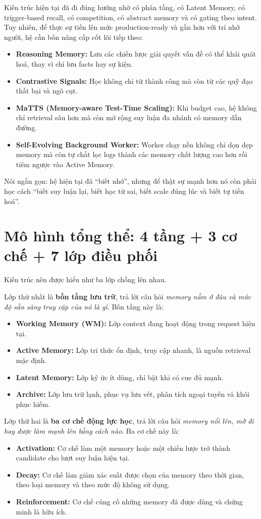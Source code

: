 \documentclass[a4paper,12pt]{article}
\begin{document}
Kiến trúc hiện tại đã đi đúng hướng nhờ có phân tầng, có Latent Memory, có trigger-based recall, có competition, có abstract memory và có gating theo intent. Tuy nhiên, để thực sự tiến lên mức production-ready và gần hơn với trí nhớ người, hệ cần bốn nâng cấp cốt lõi tiếp theo:
\begin{itemize}
    \item \textbf{Reasoning Memory:} Lưu các chiến lược giải quyết vấn đề có thể khái quát hoá, thay vì chỉ lưu facts hay sự kiện.
    \item \textbf{Contrastive Signals:} Học không chỉ từ thành công mà còn từ các quỹ đạo thất bại và ngõ cụt.
    \item \textbf{MaTTS (Memory-aware Test-Time Scaling):} Khi budget cao, hệ không chỉ retrieval sâu hơn mà còn mở rộng suy luận đa nhánh có memory dẫn đường.
    \item \textbf{Self-Evolving Background Worker:} Worker chạy nền không chỉ dọn dẹp memory mà còn tự chắt lọc logs thành các memory chất lượng cao hơn rồi tiêm ngược vào Active Memory.
\end{itemize}

Nói ngắn gọn: hệ hiện tại đã ``biết nhớ'', nhưng để thật sự mạnh hơn nó còn phải học cách ``biết suy luận lại, biết học từ sai, biết scale đúng lúc và biết tự tiến hoá''.

\section{Mô hình tổng thể: 4 tầng + 3 cơ chế + 7 lớp điều phối}

Kiến trúc nên được hiểu như ba lớp chồng lên nhau.

Lớp thứ nhất là \textbf{bốn tầng lưu trữ}, trả lời câu hỏi \emph{memory nằm ở đâu và mức độ sẵn sàng truy cập của nó là gì}. Bốn tầng này là:
\begin{itemize}
    \item \textbf{Working Memory (WM):} Lớp context đang hoạt động trong request hiện tại.
    \item \textbf{Active Memory:} Lớp tri thức ổn định, truy cập nhanh, là nguồn retrieval mặc định.
    \item \textbf{Latent Memory:} Lớp ký ức ít dùng, chỉ bật khi có cue đủ mạnh.
    \item \textbf{Archive:} Lớp lưu trữ lạnh, phục vụ lưu vết, phân tích ngoại tuyến và khôi phục hiếm.
\end{itemize}

Lớp thứ hai là \textbf{ba cơ chế động lực học}, trả lời câu hỏi \emph{memory nổi lên, mờ đi hay được làm mạnh lên bằng cách nào}. Ba cơ chế này là:
\begin{itemize}
    \item \textbf{Activation:} Cơ chế làm một memory hoặc một chiến lược trở thành candidate cho lượt suy luận hiện tại.
    \item \textbf{Decay:} Cơ chế làm giảm xác suất được chọn của memory theo thời gian, theo loại memory và theo mức độ không sử dụng.
    \item \textbf{Reinforcement:} Cơ chế củng cố những memory đã được dùng và chứng minh là hữu ích.
\end{itemize}
\end{document}

